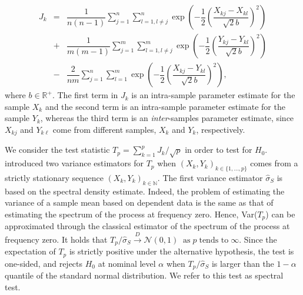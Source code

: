 \begin{eqnarray}\label{ec:jk}
	\nonumber	J_k&=& \dfrac{1}{n(n-1)} \sum_{j=1}^{n} \sum_{l=1, l \not =
		j}^{n} \exp\left(-\dfrac{1}{2}\left(\dfrac{X_{kj}-X_{kl}}{\sqrt{2}b}\right)^2\right)\\&+& \nonumber\dfrac{1}{m(m-1)} \sum_{j=1}^{m} \sum_{l=1, l \not =
		j}^{m} \exp\left(-\dfrac{1}{2}\left(\dfrac{Y_{kj}-Y_{kl}}{\sqrt{2}b}\right)^2\right)\\&-&
	\dfrac{2}{nm}\sum_{j=1}^{n} \sum_{l=1}^{m} \exp\left(-\dfrac{1}{2}\left(\dfrac{X_{kj}-Y_{kl}}{\sqrt{2}b}\right)^2\right),
\end{eqnarray}
where $b \in \mathbb{R}^{+}$. The first term in $J_k$ is an intra-sample parameter
estimate for the sample $X_k$ and the second term is an intra-sample
parameter estimate for the sample $Y_k$,  whereas the third term is an
{\it inter}-samples parameter estimate, since $X_{kj}$  and $Y_{k\ell}$ come
from different samples, $X_k$ and $Y_k$, respectively. 


We consider the test statistic $T_p=\sum_{k=1}^{p} J_k/\sqrt{p}$ in order to test for $H_0$. \cite{Marta2} introduced two variance estimators for $T_p$
when $(X_k,Y_k)_{k \in \{1, \dots, p\}}$ comes from a strictly stationary 
sequence  $(X_k,Y_k)_{k\in\mathbb{N}}$. The first variance estimator $\widehat \sigma_S$ is based on the spectral density estimate. Indeed, the problem of estimating the
variance of a sample mean based on dependent data is the same as that of estimating the
spectrum of the process at frequency zero. Hence, Var($T_p$) can be approximated through the
classical estimator of the spectrum of the process at frequency zero. It holds that $T_p/\widehat{\sigma}_S \overset{D}{\longrightarrow} \mathcal{N}(0,1)\;\; \text{as} \; p \; \text{tends to} \; \infty.$ 
Since the expectation of $T_p$ is strictly positive under the alternative hypothesis, the test is one-sided, and rejects $H_0$ at nominal level $\alpha$ when $T_p/\widehat{\sigma}_S$ is larger than
the $1-\alpha$ quantile of the standard normal distribution. We refer to this test as spectral test.

